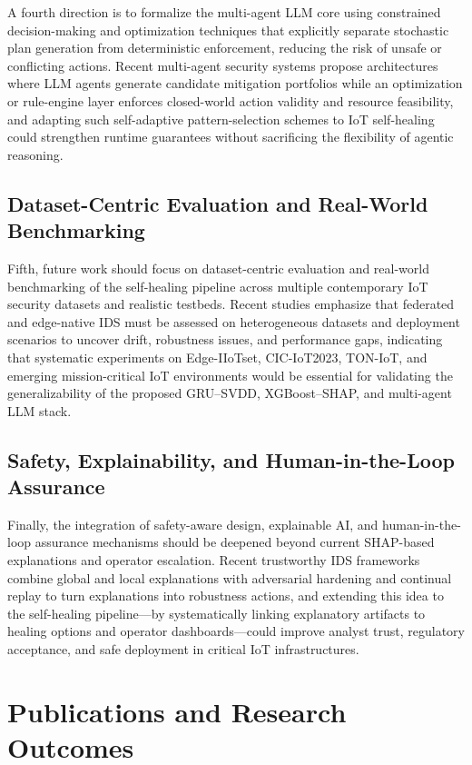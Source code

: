 A fourth direction is to formalize the multi-agent LLM core using constrained decision-making and optimization techniques that explicitly separate stochastic plan generation from deterministic enforcement, reducing the risk of unsafe or conflicting actions. Recent multi-agent security systems propose architectures where LLM agents generate candidate mitigation portfolios while an optimization or rule-engine layer enforces closed-world action validity and resource feasibility, and adapting such self-adaptive pattern-selection schemes to IoT self-healing could strengthen runtime guarantees without sacrificing the flexibility of agentic reasoning.

\subsection{Dataset-Centric Evaluation and Real-World Benchmarking}

Fifth, future work should focus on dataset-centric evaluation and real-world benchmarking of the self-healing pipeline across multiple contemporary IoT security datasets and realistic testbeds. Recent studies emphasize that federated and edge-native IDS must be assessed on heterogeneous datasets and deployment scenarios to uncover drift, robustness issues, and performance gaps, indicating that systematic experiments on Edge-IIoTset, CIC-IoT2023, TON-IoT, and emerging mission-critical IoT environments would be essential for validating the generalizability of the proposed GRU--SVDD, XGBoost--SHAP, and multi-agent LLM stack.

\subsection{Safety, Explainability, and Human-in-the-Loop Assurance}

Finally, the integration of safety-aware design, explainable AI, and human-in-the-loop assurance mechanisms should be deepened beyond current SHAP-based explanations and operator escalation. Recent trustworthy IDS frameworks combine global and local explanations with adversarial hardening and continual replay to turn explanations into robustness actions, and extending this idea to the self-healing pipeline---by systematically linking explanatory artifacts to healing options and operator dashboards---could improve analyst trust, regulatory acceptance, and safe deployment in critical IoT infrastructures.

\section{Publications and Research Outcomes}

